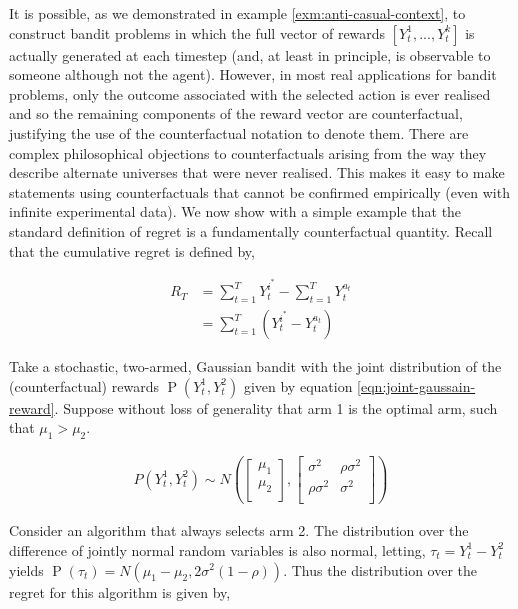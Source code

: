 \documentclass[11pt,a4paper,twoside]{report}
\newcommand{\eqn}[1]{\begin{align}#1\end{align}}
\renewcommand{\P}[1]{\operatorname{P}\left(#1\right)}
\newcommand{\cfb}[2]{{#1}_t^{#2}} %
\newcommand{\rawregret}{R_{T}} %
\theoremstyle{plain}
\theoremstyle{definition}
\begin{document}
It is possible, as we demonstrated in example \ref{exm:anti-casual-context}, to construct bandit problems in which the full vector of rewards $[\cfb{Y}{1},...,\cfb{Y}{k}]$ is actually generated at each timestep (and, at least in principle, is observable to someone although not the agent). However, in most real applications for bandit problems, only the outcome associated with the selected action is ever realised and so the remaining components of the reward vector are counterfactual, justifying the use of the counterfactual notation to denote them. There are complex philosophical objections to counterfactuals arising from the way they describe alternate universes that were never realised. This makes it easy to make statements using counterfactuals that cannot be confirmed empirically (even with infinite experimental data). We now show with a simple example that the standard definition of regret is a fundamentally counterfactual quantity. Recall that the cumulative regret is defined by,

\eqn{
\label{eqn:raw_regret2}
\rawregret &= \sum_{t=1}^T \cfb{Y}{i^*} - \sum_{t=1}^T \cfb{Y}{a_t}
\\&= \sum_{t=1}^T \left(\cfb{Y}{i^*} - \cfb{Y}{a_t}\right)
}

Take a stochastic, two-armed, Gaussian bandit with the joint distribution of the (counterfactual) rewards $\P{\cfb{Y}{1},\cfb{Y}{2}}$ given by equation \ref{eqn:joint-gaussain-reward}. Suppose without loss of generality that arm 1 is the optimal arm, such that $\mu_1 > \mu_2$.  

\eqn{
\label{eqn:joint-gaussain-reward}
P(\cfb{Y}{1},\cfb{Y}{2}) \sim N( 
         \begin{bmatrix}
           \mu_{1} \\
           \mu_2 \\
         \end{bmatrix},
         \begin{bmatrix}
           \sigma^2 & \rho \sigma^2 \\
           \rho \sigma^2 & \sigma^2 \\
         \end{bmatrix}
         )
}

Consider an algorithm that always selects arm 2.  The distribution over the difference of jointly normal random variables is also normal, letting, $\tau_t = \cfb{Y}{1} - \cfb{Y}{2}$ yields $\P{\tau_t} = N(\mu_1 - \mu_2,2\sigma^{2}(1-\rho))$. Thus the distribution over the regret for this algorithm is given by,
\end{document}
